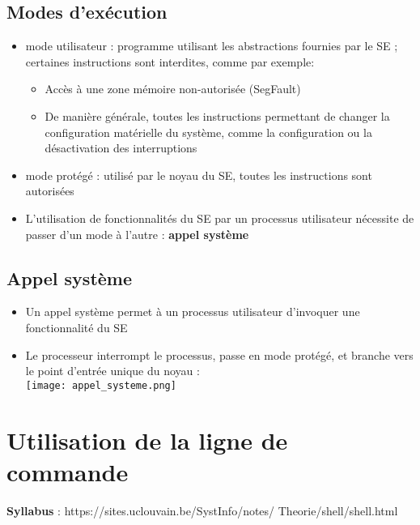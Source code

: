 \documentclass{article}
\begin{document}
    \subsection{Modes d'exécution}
        \begin{itemize}
            \item mode utilisateur : programme utilisant les abstractions
            fournies par le SE ; certaines instructions sont interdites, comme par exemple:
            \begin{itemize}
                \item Accès à une zone mémoire non-autorisée (SegFault)
                \item De manière générale, toutes les instructions permettant de
                changer la configuration matérielle du système, comme la
                configuration ou la désactivation des interruptions
            \end{itemize}
            \item mode protégé : utilisé par le noyau du SE, toutes les
            instructions sont autorisées
            \item L’utilisation de fonctionnalités du SE par un processus
            utilisateur nécessite de passer d’un mode à l’autre : \textbf{appel système}
        \end{itemize}
    
    \subsection{Appel système}
        \begin{itemize}
            \item Un appel système permet à un processus utilisateur
            d’invoquer une fonctionnalité du SE
            \item Le processeur interrompt le processus, passe en mode
            protégé, et branche vers le point d’entrée unique du noyau :\\
            \texttt{[image: appel\_systeme.png]}
        \end{itemize}
            

\section{Utilisation de la ligne de commande}
\textbf{Syllabus} : https://sites.uclouvain.be/SystInfo/notes/
Theorie/shell/shell.html
\end{document}
